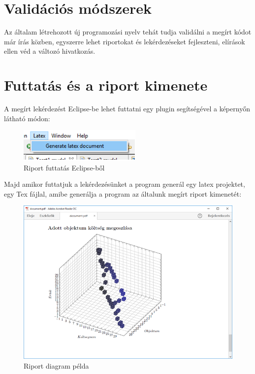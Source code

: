 \section{Validációs módszerek}
Az általam létrehozott új programozási nyelv tehát tudja validálni a megírt kódot már írás közben, egyszerre lehet riportokat és lekérdezéseket fejleszteni, elírások ellen véd a változó hivatkozás.

\section{Futtatás és a riport kimenete}
A megírt lekérdezést Eclipse-be lehet futtatni egy plugin segítségével a képernyőn látható módon:

\begin{figure}[!ht]
\centering
\includegraphics[width=60mm, keepaspectratio]{figures/run.png}
\caption{Riport futtatás Eclipse-ből} 
\label{fig:Overview}
\end{figure}

Majd amikor futtatjuk a lekérdezésünket a program generál egy latex projektet, egy Tex fájlal, amibe generálja a program az általunk megírt riport kimenetét:

 \begin{figure}[!ht]
\centering
\includegraphics[width=120mm, keepaspectratio]{figures/Report.png}
\caption{Riport diagram példa} 
\label{fig:Overview}
\end{figure}





